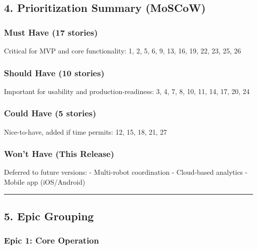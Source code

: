 \documentclass[
]{article}
\begin{document}
\hypertarget{prioritization-summary-moscow}{%
\subsection{4. Prioritization Summary
(MoSCoW)}\label{prioritization-summary-moscow}}

\hypertarget{must-have-17-stories}{%
\subsubsection{Must Have (17 stories)}\label{must-have-17-stories}}

Critical for MVP and core functionality: 1, 2, 5, 6, 9, 13, 16, 19, 22,
23, 25, 26

\hypertarget{should-have-10-stories}{%
\subsubsection{Should Have (10 stories)}\label{should-have-10-stories}}

Important for usability and production-readiness: 3, 4, 7, 8, 10, 11,
14, 17, 20, 24

\hypertarget{could-have-5-stories}{%
\subsubsection{Could Have (5 stories)}\label{could-have-5-stories}}

Nice-to-have, added if time permits: 12, 15, 18, 21, 27

\hypertarget{wont-have-this-release}{%
\subsubsection{Won't Have (This Release)}\label{wont-have-this-release}}

Deferred to future versions: - Multi-robot coordination - Cloud-based
analytics - Mobile app (iOS/Android)

\begin{center}\rule{0.5\linewidth}{0.5pt}\end{center}

\hypertarget{epic-grouping}{%
\subsection{5. Epic Grouping}\label{epic-grouping}}

\hypertarget{epic-1-core-operation}{%
\subsubsection{Epic 1: Core Operation}\label{epic-1-core-operation}}
\end{document}
